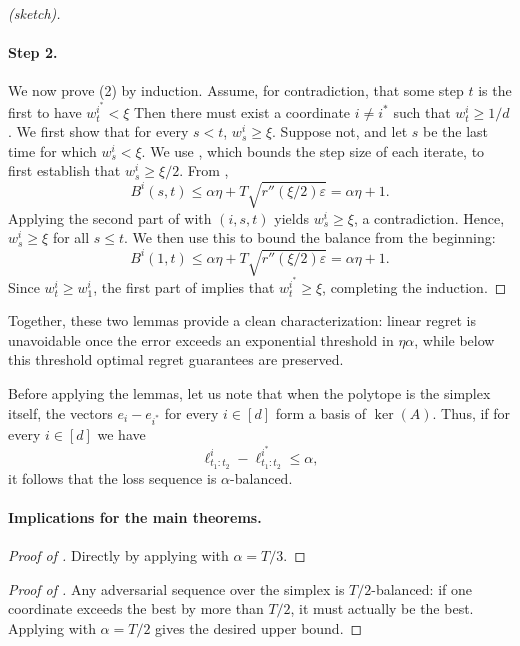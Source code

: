 \documentclass[10pt]{article}
\theoremstyle{definition}
\theoremstyle{remark}
\newenvironment{proofsketch}[1][\proofname]{%
  \begin{proof}[#1 (sketch)]%
}{%
  \end{proof}%
}
\renewcommand{\epsilon}{\varepsilon}
\begin{document}
\begin{proofsketch}
\paragraph{Step 2.} 
We now prove (2) by induction. 
Assume, for contradiction, that some step $t$ is the first to have $w_t^{i^*} < \xi$ 
Then there must exist a coordinate $i\ne i^*$ 
such that $w_t^i \ge 1/d$. 
We first show that for every $s < t$, $w_s^i \ge \xi$. 
Suppose not, and let $s$ be the last time for which $w_s^i < \xi$. 
We use , which bounds the step size of each iterate, to first establish that $w_s^i \ge \xi/2$. 
From ,
\[
    B^i(s,t) \le \alpha\eta + T\sqrt{r''(\xi/2)\epsilon} = \alpha\eta + 1.
\]
Applying the second part of  with $(i,s,t)$ yields $w_s^i \ge \xi$, a contradiction. 
Hence, $w_s^i \ge \xi$ for all $s \le t$. 
We then use this to bound the balance from the beginning:
\[
    B^i(1,t) \le \alpha\eta + T\sqrt{r''(\xi/2)\epsilon} = \alpha\eta + 1.
\]
Since $w_t^i \ge w_1^i$, the first part of  implies that $w_t^{i^*} \ge \xi$, completing the induction.
\end{proofsketch}

Together, these two lemmas provide a clean characterization: 
linear regret is unavoidable once the error exceeds an exponential threshold in $\eta \alpha$, 
while below this threshold optimal regret guarantees are preserved. 

Before applying the lemmas, let us note that when the polytope is the simplex itself, the vectors 
$e_i - e_{i^*}$ for every $i \in [d]$ form a basis of $\ker(A)$. 
Thus, if for every $i \in [d]$ we have
\[
    \ell_{t_1:t_2}^i - \ell_{t_1:t_2}^{i^*} \le \alpha,
\]
it follows that the loss sequence is $\alpha$-balanced.

\paragraph{Implications for the main theorems.}

\begin{proof}[Proof of ]
Directly by applying  with $\alpha=T/3$.
\end{proof}

\begin{proof}[Proof of ] 
Any adversarial sequence over the simplex is $T/2$-balanced: if one coordinate exceeds the best by more than $T/2$, it must actually be the best. 
Applying  with $\alpha=T/2$ gives the desired upper bound.
\end{proof}
\end{document}
